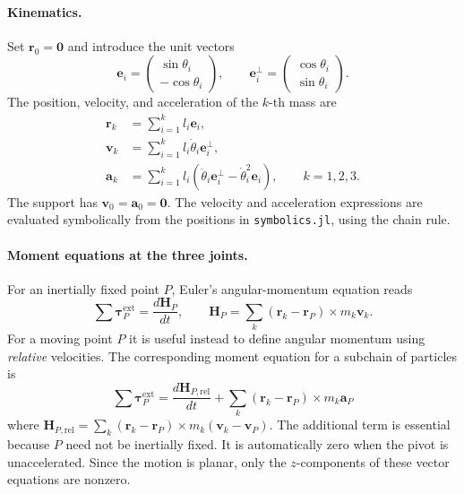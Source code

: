 \paragraph{Kinematics.}
Set $\mathbf r_0=\mathbf 0$ and introduce the unit vectors
\begin{equation}
    \mathbf e_i =
    \begin{pmatrix}\sin\theta_i\\-\cos\theta_i\end{pmatrix},
    \qquad
    \mathbf e_i^\perp =
    \begin{pmatrix}\cos\theta_i\\\sin\theta_i\end{pmatrix}.
\end{equation}
The position, velocity, and acceleration of the $k$-th mass are
\begin{align}
    \mathbf r_k &= \sum_{i=1}^{k} l_i\mathbf e_i, \\
    \mathbf v_k &= \sum_{i=1}^{k} l_i\dot\theta_i\mathbf e_i^\perp, \\
    \mathbf a_k &= \sum_{i=1}^{k} l_i\left(
        \ddot\theta_i\mathbf e_i^\perp
        -\dot\theta_i^2\mathbf e_i\right),
    \qquad k=1,2,3.
    \label{eq:triple_ne_kinematics}
\end{align}
The support has $\mathbf v_0=\mathbf a_0=\mathbf 0$. The velocity and
acceleration expressions are evaluated symbolically from the positions in
\texttt{symbolics.jl}, using the chain rule.

\paragraph{Moment equations at the three joints.}
For an inertially fixed point $P$, Euler's angular-momentum equation reads
\begin{equation}
    \sum\boldsymbol\tau_P^{\mathrm{ext}}
    = \frac{d\mathbf H_P}{dt},
    \qquad
    \mathbf H_P=\sum_k(\mathbf r_k-\mathbf r_P)
        \times m_k\mathbf v_k.
\end{equation}
For a moving point $P$ it is useful instead to define angular momentum using
\emph{relative} velocities. The corresponding moment equation for a subchain
of particles is
\begin{equation}
    \boxed{
    \sum\boldsymbol\tau_P^{\mathrm{ext}}
    =\frac{d\mathbf H_{P,\mathrm{rel}}}{dt}
    +\sum_k(\mathbf r_k-\mathbf r_P)\times m_k\mathbf a_P
    }
    \label{eq:triple_ne_moving_pivot}
\end{equation}
where
$\mathbf H_{P,\mathrm{rel}}=\sum_k(\mathbf r_k-\mathbf r_P)
\times m_k(\mathbf v_k-\mathbf v_P)$.
The additional term is essential because $P$ need not be inertially fixed.
It is automatically zero when the pivot is unaccelerated. Since the motion is planar, only
the $z$-components of these vector equations are nonzero.

